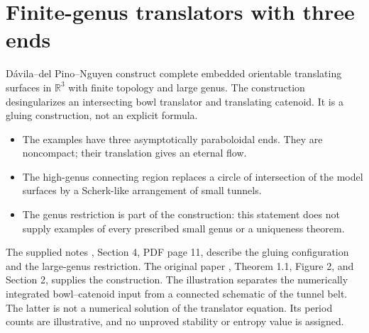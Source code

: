 \chapter{Finite-genus translators with three ends}\label{sec:catalogue-finite-genus-translators}
\begin{example}\label{ex:catalogue-finite-genus-translators}
D\'avila--del Pino--Nguyen construct complete embedded orientable translating surfaces in $\mathbb R^3$ with finite topology and large genus. The construction desingularizes an intersecting bowl translator and translating catenoid. It is a gluing construction, not an explicit formula.
\begin{itemize}
\item The examples have three asymptotically paraboloidal ends. They are noncompact; their translation gives an eternal flow.
\item The high-genus connecting region replaces a circle of intersection of the model surfaces by a Scherk-like arrangement of small tunnels.
\item The genus restriction is part of the construction: this statement does not supply examples of every prescribed small genus or a uniqueness theorem.
\end{itemize}
The supplied notes \cite{CatHIMWNotes19}, Section 4, PDF page 11, describe the gluing configuration and the large-genus restriction. The original paper \cite{CatDPN17}, Theorem 1.1, Figure 2, and Section 2, supplies the construction. The illustration separates the numerically integrated bowl--catenoid input from a connected schematic of the tunnel belt. The latter is not a numerical solution of the translator equation. Its period counts are illustrative, and no unproved stability or entropy value is assigned.
\end{example}

